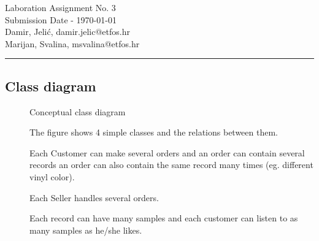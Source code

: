 \documentclass[11pt,a4paper]{article}
\begin{document}
\large
Laboration Assignment No. 3\\
Submission Date - \yyyymmdddate \today \\
Damir, Jelić, damir.jelic@etfos.hr \\
Marijan, Svalina, msvalina@etfos.hr
\\
\rule{\linewidth}{0.1mm}

\setcounter{section}{3}
\subsection{Class diagram}
\begin{figure}[htb]
    \begin{center}
        \setlength\fboxsep{0pt}
    \end{center}
    \caption{Conceptual class diagram}
    \label{fig:class_diag}
\end{figure}
\begin{description}
    \item[]
        The figure shows 4 simple classes and the relations between them.
    \item[]
        Each Customer can make several orders and an order can contain several
        records an order can also contain the same record many times (eg. different vinyl color).
    \item[]
        Each Seller handles several orders.
    \item[]
        Each record can have many samples and each customer can 
        listen to as many samples as he/she likes.
\end{description}

\newpage
\end{document}
